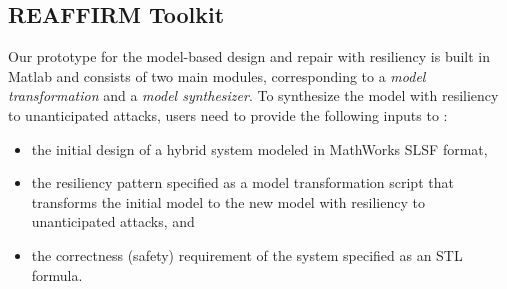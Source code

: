 \subsection{REAFFIRM Toolkit}
%
Our \toolreaffirm prototype for the model-based design and repair with resiliency is built in Matlab and consists of two main modules, corresponding to a \emph{model transformation} and a \emph{model synthesizer}. To synthesize the model with resiliency to unanticipated attacks, users need to provide the following inputs to \toolreaffirm:
%
\begin{itemize}[leftmargin= 2 em]
    \item the initial design of a hybrid system modeled in MathWorks SLSF format,
		\item the resiliency pattern specified as a model transformation script that transforms the initial model to the new model with resiliency to unanticipated attacks, and
		\item the correctness (safety) requirement of the system specified as an STL formula.
%
\end{itemize}

